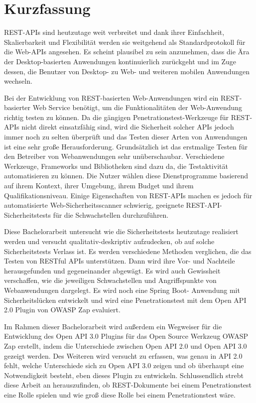 \chapter{Kurzfassung}

REST-APIs sind heutzutage weit verbreitet und dank ihrer Einfachheit, Skalierbarkeit und Flexibilität werden sie weitgehend als Standardprotokoll für die Web-APIs angesehen. Es scheint plausibel zu sein anzunehmen, dass die Ära der Desktop-basierten Anwendungen kontinuierlich zurückgeht und im Zuge dessen, die Benutzer von Desktop- zu Web- und weiteren mobilen Anwendungen wechseln.

Bei der Entwicklung von REST-basierten Web-Anwendungen wird ein REST-basierter Web Service benötigt, um die Funktionalitäten der Web-Anwendung richtig testen zu können. Da die gängigen Penetrationstest-Werkzeuge für REST-APIs nicht direkt einsatzfähig sind, wird die Sicherheit solcher APIs jedoch immer noch zu selten überprüft und das Testen dieser Arten von Anwendungen ist eine sehr große Herausforderung. Grundsätzlich ist das erstmalige Testen für den Betreiber von Webanwendungen sehr unüberschaubar. Verschiedene Werkzeuge, Frameworks und Bibliotheken sind dazu da, die Testaktivität automatisieren zu können. Die Nutzer wählen diese Dienstprogramme basierend auf ihrem Kontext, ihrer Umgebung, ihrem Budget und ihrem Qualifikationsniveau. Einige Eigenschaften von REST-APIs machen es jedoch für automatisierte Web-Sicherheitsscanner schwierig, geeignete REST-API-Sicherheitstests für die Schwachstellen durchzuführen.

Diese Bachelorarbeit untersucht wie die Sicherheitstests heutzutage realisiert werden und versucht qualitativ-deskriptiv aufzudecken, ob auf solche Sicherheitstests Verlass ist. Es werden verschiedene Methoden verglichen, die das Testen von RESTful APIs unterstützen. Dann wird ihre Vor- und Nachteile herausgefunden und gegeneinander abgewägt. Es wird auch Gewissheit verschaffen, wie die jeweiligen Schwachstellen und Angriffspunkte von Webanwendungen dargelegt. Es wird noch eine Spring Boot- Anwendung mit Sicherheitslücken entwickelt und wird eine Penetrationstest mit dem Open API 2.0 Plugin von OWASP Zap evaluiert.

Im Rahmen dieser Bachelorarbeit wird außerdem ein Wegweiser für die Entwicklung des Open API 3.0 Plugins für das Open Source Werkzeug OWASP Zap erstellt, indem die Unterschiede zwischen Open API 2.0 und Open API 3.0 gezeigt werden. Des Weiteren wird versucht zu erfassen, was genau in API 2.0 fehlt, welche Unterschiede sich zu Open API 3.0 zeigen und ob überhaupt eine Notwendigkeit besteht, eben dieses Plugin zu entwickeln. Schlussendlich strebt diese Arbeit an herauszufinden, ob REST-Dokumente bei einem Penetrationstest eine Rolle spielen und wie groß diese Rolle bei einem Penetrationstest wäre.